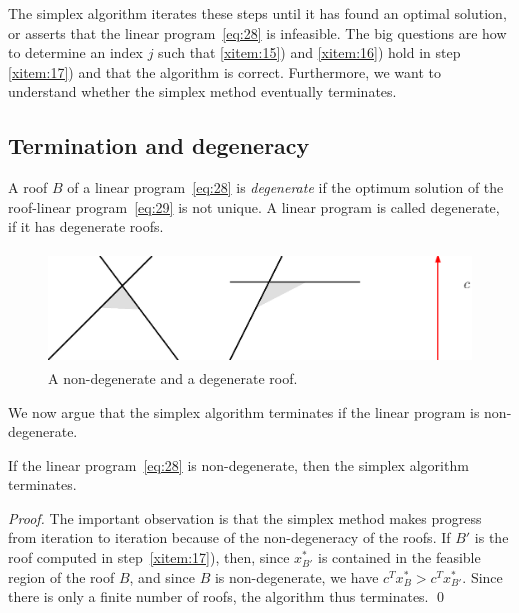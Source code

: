 The simplex algorithm iterates these steps until it has found an
optimal solution, or asserts that the linear program~\eqref{eq:28} is
infeasible. The big questions are how to determine an index $j$ such
that \ref{xitem:15}) and \ref{xitem:16}) hold in step \ref{xitem:17}) and
that the algorithm is correct. Furthermore, we want to understand
whether the simplex method eventually terminates.  







\subsection{Termination and degeneracy}




\begin{definition}
  \label{def:4}
  A roof $B$ of a linear program~\eqref{eq:28} is \emph{degenerate} if
  the optimum solution of the roof-linear program~\eqref{eq:29} is not
  unique. A linear program is called degenerate, if it has degenerate
  roofs. 
\end{definition}


\begin{figure}[htbp]
  \centering
  \includegraphics[height=3cm]{figures/degnodeg.eps}
  \caption{A non-degenerate and a degenerate roof.}
  \label{fig:non-deg-deg}
\end{figure}



We now argue that the simplex algorithm  terminates if the linear
program is non-degenerate. 

\begin{theorem}
  \label{thr:1}
  If the linear program~\eqref{eq:28} is non-degenerate, then the
  simplex algorithm terminates. 
\end{theorem}



\begin{proof}
  The important observation is that the simplex method makes progress
  from iteration to iteration because of the non-degeneracy of the
  roofs. If $B'$ is the roof computed in step~\ref{xitem:17}), then,
  since $x^*_{B'}$ is contained in the feasible region of the roof
  $B$, and since $B$ is non-degenerate, we have
  $c^Tx^*_B>c^Tx^*_{B'}$. Since there is only a finite number of
  roofs, the algorithm thus terminates. \qed
\end{proof}


